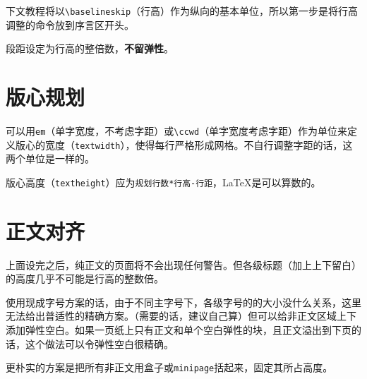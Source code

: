 \documentclass[10pt,openany]{book}
\begin{document}
下文教程将以\texttt{\textbackslash{}baselineskip}（行高）作为纵向的基本单位，所以第一步是将行高调整的命令放到序言区开头。



段距设定为行高的整倍数，\textbf{不留弹性}。



\section{版心规划}

可以用\texttt{em}（单字宽度，不考虑字距）或\texttt{\textbackslash{}ccwd}（单字宽度考虑字距）作为单位来定义版心的宽度（\texttt{textwidth}），使得每行严格形成网格。不自行调整字距的话，这两个单位是一样的。

版心高度（\texttt{textheight}）应为\texttt{规划行数*行高-行距}，\LaTeX 是可以算数的。



\section{正文对齐}

上面设完之后，纯正文的页面将不会出现任何警告。但各级标题（加上上下留白）的高度几乎不可能是行高的整数倍。

使用现成字号方案的话，由于不同主字号下，各级字号的的大小没什么关系，这里无法给出普适性的精确方案。（需要的话，建议自己算）但可以给非正文区域上下添加弹性空白。如果一页纸上只有正文和单个空白弹性的块，且正文溢出到下页的话，这个做法可以令弹性空白很精确。



更朴实的方案是把所有非正文用盒子或\texttt{minipage}括起来，固定其所占高度。



\stopcontents[tutorial]

\listoftables
\listoffigures
\lstlistoflistings
\end{document}
